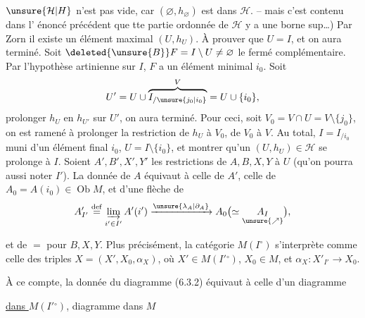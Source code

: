   $\unsure{\mathcal H|H}$ n'est pas vide, car $(\varnothing,h_\varnothing)$ est
dans $\mathcal H$. -- mais c'est contenu dans l'
énoncé précédent que tte partie  ordonnée
de $\mathcal H$ y a une borne sup\ldots) Par Zorn
il existe un élément maximal $(U,h_U)$.
À prouver que $U=I$, et on aura terminé.
Soit $\deleted{\unsure{B}}F=I\setminus U\ne\varnothing$ le fermé complémentaire.
Par l'hypothèse artinienne sur $I$,
$F$ a un élément minimal $i_0$. 
Soit
\[
 U'=U\cup\overbrace{I_{/\unsure{j_0|i_0}}}^{V}=U\cup\{i_0\},
\]
  prolonger $h_U$ en $h_{U'}$ sur $U'$,
on aura terminé. Pour ceci, soit
$V_0=V\cap U=V\setminus\{j_0\}$, on est ramené
à prolonger la restriction  de $h_U$ à $V_0$,
de $V_0$ à $V$. Au total, 
$I=I_{/i_0}$ muni d'un élément final $i_0$,
$U=I\setminus\{i_0\}$, et montrer qu'un
$(U,h_U)\in\mathcal H$ se prolonge à $I$. Soient
$A',B',X',Y'$ les restrictions de $A,B,X,Y$
à $U$  (qu'on pourra aussi noter $I'$).
La donnée de $A$ équivaut à celle
de $A'$, celle de $A_0=A(i_0)\in\operatorname{Ob} M$, et
d'une flèche de
\[
 A'_{I'}\overset{\mathrm{def}}{=}
 \underset{i'\in I'}{\underrightarrow{\lim}}\,A'(i')\xrightarrow{\unsure{\lambda_A|\partial_A}}
 A_0\bigl(\simeq\underset{\unsure{\nearrow}}{A_I}\bigr),
\]

et de $=$ pour $B,X,Y$. Plus précisément,
la catégorie $M(I^\circ)$ s'interprète comme
celle des triples $X=(X',X_0,\alpha_X)$, où
$X'\in M(I'{}^\circ)$, $X_0\in M$, et $\alpha_X\colon X'_{I'}\longrightarrow X_0$.

À ce compte, la donnée du diagramme
(6.3.2) équivaut à celle d'un diagramme 


\uline{dans $M(I'{}^\circ)$},   diagramme
dans $M$

